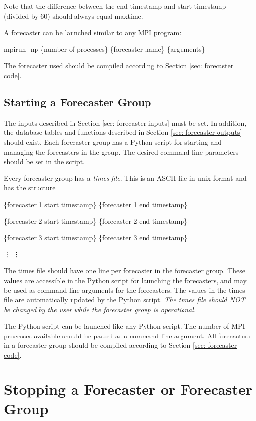 \documentclass[12pt]{article}
\newenvironment{codeindent}
{\begin{list}{}
        {\setlength{\leftmargin}{.1in}}
        \item[]
}
{\end{list}}
\begin{document}
Note that the difference between the end timestamp and start timestamp (divided by 60) should always equal maxtime.

A forecaster can be launched similar to any MPI program:
\begin{codeindent}
 mpirun -np \{number of processes\} \{forecaster name\} \{arguments\}
\end{codeindent}
The forecaster used should be compiled according to Section \ref{sec: forecaster code}.

\subsection{Starting a Forecaster Group} \label{sec: starting forecaster group}

The inputs described in Section \ref{sec: forecaster inputs} must be set. In addition, the database tables and functions described in Section \ref{sec: forecaster outputs} should exist. Each forecaster group has a Python script for starting and managing the forecasters in the group. The desired command line parameters should be set in the script.

Every forecaster group has a \emph{times file}. This is an ASCII file in unix format and has the structure
\begin{codeindent}
 \{forecaster 1 start timestamp\} \{forecaster 1 end timestamp\}
 
 \{forecaster 2 start timestamp\} \{forecaster 2 end timestamp\}
 
 \{forecaster 3 start timestamp\} \{forecaster 3 end timestamp\}
 
 \hspace{1in} \vdots \hspace{2in} \vdots
\end{codeindent}
The times file should have one line per forecaster in the forecaster group. These values are accessible in the Python script for launching the forecasters, and may be used as command line arguments for the forecasters. The values in the times file are automatically updated by the Python script. \emph{The times file should NOT be changed by the user while the forecaster group is operational.} 

The Python script can be launched like any Python script. The number of MPI processes available should be passed as a command line argument. All forecasters in a forecaster group should be compiled according to Section \ref{sec: forecaster code}.

\section{Stopping a Forecaster or Forecaster Group} \label{sec: stopping}
\end{document}
